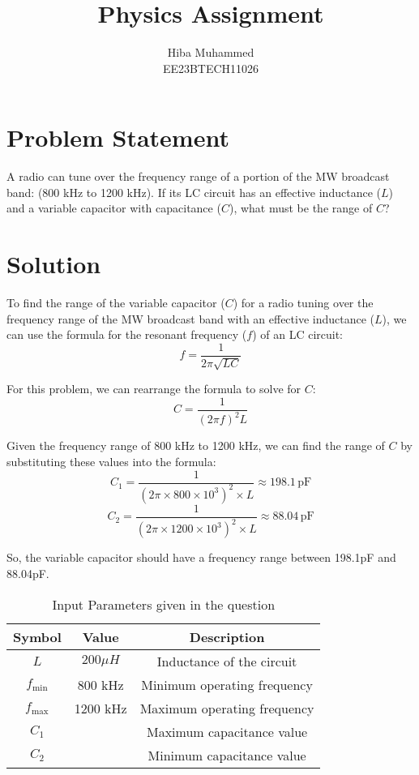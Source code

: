 \documentclass[12pt]{article}
\title{Physics Assignment}
\author{Hiba Muhammed \\
          EE23BTECH11026}
\begin{document}
    \maketitle

    \section*{Problem Statement}
    A radio can tune over the frequency range of a portion of the MW broadcast band: (800 kHz to 1200 kHz). If its LC circuit has an effective inductance (\(L\)) and a variable capacitor with capacitance (\(C\)), what must be the range of \(C\)?

    \section*{Solution}
    To find the range of the variable capacitor (\(C\)) for a radio tuning over the frequency range of the MW broadcast band with an effective inductance (\(L\)), we can use the formula for the resonant frequency (\(f\)) of an LC circuit:
    \[ f = \frac{1}{2\pi\sqrt{LC}} \]

    For this problem, we can rearrange the formula to solve for \(C\):
    \[ C = \frac{1}{(2\pi f)^2L} \]

    Given the frequency range of 800 kHz to 1200 kHz, we can find the range of \(C\) by substituting these values into the formula:
    \[ C_1 = \frac{1}{(2\pi \times 800 \times 10^3)^2 \times L} \approx 198.1 \, \text{pF} \]
    \[ C_2 = \frac{1}{(2\pi \times 1200 \times 10^3)^2 \times L} \approx 88.04 \, \text{pF} \]

    So, the variable capacitor should have a frequency range between 198.1pF and 88.04pF.

    \begin{table}[h]
      \centering
      \caption{Input Parameters given in the question}
      \label{tab:parameters}
      \begin{tabular}{|c|c|c|}
        \hline
        \textbf{Symbol} & \textbf{Value} & \textbf{Description} \\
        \hline
        \(L\) & \(200 \mu H\) & Inductance of the circuit \\
        \hline
        \(f_{\text{min}}\) & 800 kHz & Minimum operating frequency \\
        \hline
        \(f_{\text{max}}\) & 1200 kHz & Maximum operating frequency \\
        \hline
        \(C_1\) &   & Maximum capacitance value \\
        \hline
        \(C_2\) &  & Minimum capacitance value \\
        \hline
      \end{tabular}
    \end{table}
\end{document}
